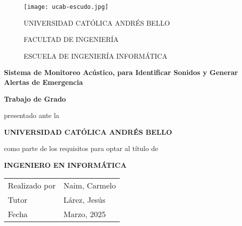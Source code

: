 \newcommand{\touppercase}[1]{\MakeUppercase{#1}}

\newcommand{\universidad}{Universidad Católica Andrés Bello}
\newcommand{\titulo}{Sistema de Monitoreo Acústico, para Identificar Sonidos y Generar Alertas de Emergencia \\}
\newcommand{\estudiante}{Naim, Carmelo}
\newcommand{\tutor}{Lárez, Jesús}

\newcommand{\membrete}{
  \normalsize\selectfont
  \touppercase{\universidad} \par
  FACULTAD DE INGENIERÍA \par
  ESCUELA DE INGENIERÍA INFORMÁTICA \par
}

\newcommand{\prelude}{
  \textbf{Trabajo de Grado} \par
  presentado ante la \par
  \touppercase{\textbf{\universidad}} \par
  como parte de los requisitos para optar al título de \par
  \touppercase{\textbf{Ingeniero en Informática}} \par
}

\newcommand{\details}{
  \begin{tabularx}{\textwidth}{X >{\hsize=1.35\hsize}X}
    Realizado por & \estudiante \\
    Tutor         & \tutor      \\
    Fecha         & Marzo, 2025 \\
  \end{tabularx}
}

\begin{center}
  \begin{figure}[h]
    \centering
    \begin{minipage}{0.15\textwidth}
      \texttt{[image: ucab-escudo.jpg]}
    \end{minipage}
    \begin{minipage}{0.7\textwidth}
      \centering
      \renewcommand{\baselinestretch}{1.5}
      \membrete
    \end{minipage}
  \end{figure}
  \vspace*{\fill}
  \textbf{\titulo}
  \vspace*{\fill}
  \prelude
  \vspace*{\fill}
  \details
\end{center}

\clearpage
